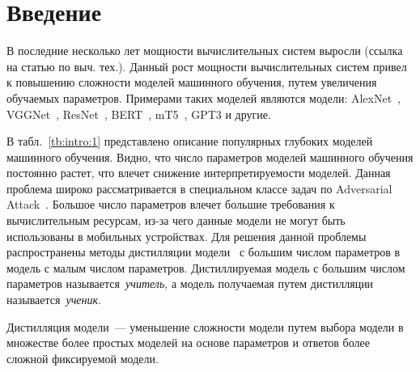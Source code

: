 \documentclass[12pt]{a&t}
\begin{document}
\section{Введение}
В последние несколько лет мощности вычислительных систем выросли (ссылка на статью по выч. тех.). Данный рост мощности вычислительных систем привел к повышению сложности моделей машинного обучения, путем увеличения обучаемых параметров. Примерами таких моделей являются модели: AlexNet~\cite{Krizhevsky2012}, VGGNet~\cite{Simonyan2014}, ResNet~\cite{Kaiming2015}, BERT~\cite{Devlin2018, Vaswani2017}, mT5~\cite{Linting2021}, GPT3\cite{Brown2020} и другие.
\begin{table}[h!]
\caption{Число параметров в моделях машинного обучения.}
\label{tb:intro:1}
\begin{center}
\end{center}
\end{table}
В табл.~\ref{tb:intro:1} представлено описание популярных глубоких моделей машинного обучения. Видно, что число параметров моделей машинного обучения постоянно растет, что влечет снижение интерпретируемости моделей. Данная проблема широко рассматривается в специальном классе задач по Adversarial Attack~\cite{Zheng2020}. Большое число параметров влечет большие требования к вычислительным ресурсам, из-за чего данные модели не могут быть использованы в мобильных устройствах. Для решения данной проблемы распространены методы дистилляции модели~\cite{Hinton2015} с большим числом параметров в модель с малым числом параметров. Дистиллируемая модель с большим числом параметров называется~\textit{учитель}, а модель получаемая путем дистилляции называется~\textit{ученик}.
\begin{definition}
Дистилляция модели~--- уменьшение сложности модели путем выбора модели в множестве более простых моделей на основе параметров и ответов более сложной фиксируемой модели.
\end{definition}
\end{document}
